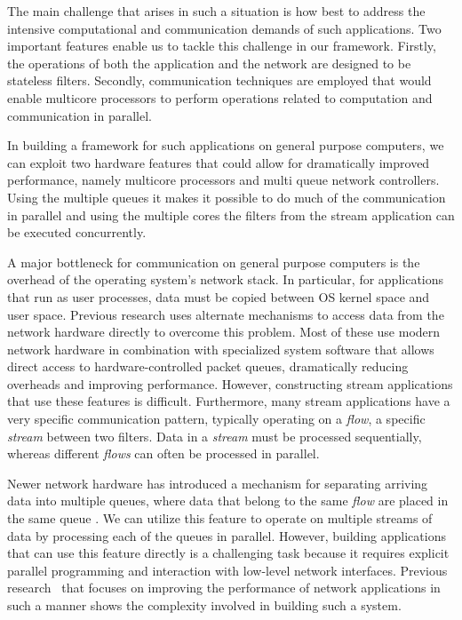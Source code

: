 \documentclass[10pt, conference, compsocconf, reqno]{IEEEtran}
\newcommand{\comment}[1]{}
\begin{document}
The main challenge that arises in such a situation is how best to address the intensive computational and communication demands of such applications. Two important features enable us to tackle this challenge in our framework. Firstly, the operations of both the application and the network are designed to be stateless filters. Secondly, communication techniques are employed that would enable multicore processors to perform operations related to computation and communication in parallel.

In building a framework for such applications on general purpose computers, we can exploit two hardware features that could allow for dramatically improved performance, namely multicore processors and multi queue network controllers. Using the multiple queues it makes it possible to do much of the communication in parallel and using the multiple cores the filters from the stream application can be executed concurrently.

A major bottleneck for communication on general purpose computers is the overhead of the operating system's network stack. In particular, for applications that run as user processes, data must be copied between OS kernel space and user space. Previous research uses alternate mechanisms to access data from the network hardware directly to overcome this problem\cite{Dobrescu09routebricks:exploiting}\cite{Han:2010:PGS:1851275.1851207}\cite{Kohler2000}. Most of these use modern network hardware in combination with specialized system software that allows direct access to hardware-controlled packet queues, dramatically reducing overheads and improving performance. However, constructing stream applications that use these features is difficult. Furthermore, many stream applications have a very specific communication pattern, typically operating on a \textit{flow}, a specific \textit{stream} between two filters. Data in a \textit{stream} must be processed sequentially, whereas different \textit{flows} can often be processed in parallel.

Newer network hardware has introduced a mechanism for separating arriving data into multiple queues, where data that belong to the same \textit{flow} are\comment{ guaranteed to be} placed in the same queue\cite{micro2008} \cite{intel2010}. We can utilize this feature to operate on multiple streams of data by processing each of the queues in parallel. However, building applications that can use this feature directly is a challenging task because it requires explicit parallel programming and interaction with low-level network interfaces. Previous research~\cite{Dobrescu09routebricks:exploiting,Han:2010:PGS:1851275.1851207} that focuses on improving the performance of network applications in such a manner shows the complexity involved in building such a system.
\end{document}
